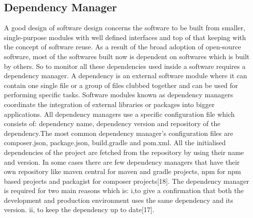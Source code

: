 \subsection{Dependency Manager}
A good design of software design concerns the software to be built from smaller, single-purpose modules with well defined interfaces and top of that keeping with the concept of software reuse. As a result of the broad adoption of open-source software, most of the softwares built now is dependent on softwares which is built by others. So to monitor all these dependencies used inside a software requires a dependency manager. A dependency is an external software module where it can contain one single file or a group of files clubbed together and can be used for performing specific tasks. Software modules known as dependency managers coordinate the integration of external libraries or packages into bigger applications. All dependency managers use a specific configuration file which consists of: dependency name, dependency version and repository of the dependency.The most common dependency manager’s configuration files are composer.json, package.json, build.gradle and pom.xml. All the initialised dependencies of the project are fetched from the repository by using their name and version. In some cases there are few dependency managers that have their own repository like maven central for maven and gradle projects, npm for npm based projects and packagist for composer projects[18]. The dependency manager is required for two main reasons which is: i,to give a confirmation that both the development and production environment uses the same dependency and its version. ii, to keep the dependency up to date[17].
%
